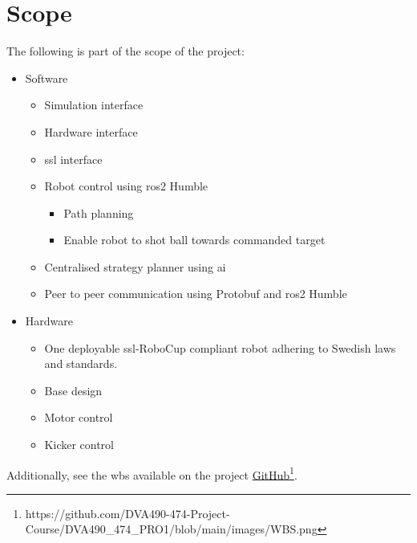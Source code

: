 \section{Scope}
\label{section:scope}

The following is part of the scope of the project:
\begin{itemize}
    \item Software
    \begin{itemize}
        \item Simulation interface
        \item Hardware interface
        \item \ac{ssl} interface
        \item Robot control using \ac{ros2} Humble
        \begin{itemize}
            \item Path planning
            \item Enable robot to shot ball towards commanded target
        \end{itemize}
        \item Centralised strategy planner using \ac{ai}
        \item Peer to peer communication using Protobuf and \ac{ros2} Humble
    \end{itemize}
    \item Hardware
    \begin{itemize}
        \item One deployable \ac{ssl}-RoboCup compliant robot adhering to Swedish laws and standards.
        \item Base design
        \item Motor control
        \item Kicker control
    \end{itemize}
\end{itemize}   
Additionally, see the \ac{wbs} available on the project \href{https://github.com/DVA490-474-Project-Course/DVA490_474_PRO1/blob/main/images/WBS.png}{GitHub}\footnote{https://github.com/DVA490-474-Project-Course/DVA490\_474\_PRO1/blob/main/images/WBS.png}.



